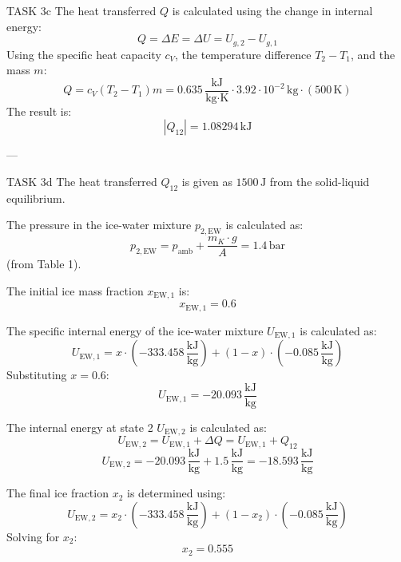 TASK 3c  
The heat transferred \( Q \) is calculated using the change in internal energy:  
\[
Q = \Delta E = \Delta U = U_{g,2} - U_{g,1}
\]  
Using the specific heat capacity \( c_V \), the temperature difference \( T_2 - T_1 \), and the mass \( m \):  
\[
Q = c_V (T_2 - T_1) m = 0.635 \, \frac{\text{kJ}}{\text{kg·K}} \cdot 3.92 \cdot 10^{-2} \, \text{kg} \cdot (500 \, \text{K})
\]  
The result is:  
\[
|Q_{12}| = 1.08294 \, \text{kJ}
\]  

---

TASK 3d  
The heat transferred \( Q_{12} \) is given as \( 1500 \, \text{J} \) from the solid-liquid equilibrium.  

The pressure in the ice-water mixture \( p_{2,\text{EW}} \) is calculated as:  
\[
p_{2,\text{EW}} = p_{\text{amb}} + \frac{m_K \cdot g}{A} = 1.4 \, \text{bar}
\]  
(from Table 1).  

The initial ice mass fraction \( x_{\text{EW},1} \) is:  
\[
x_{\text{EW},1} = 0.6
\]  

The specific internal energy of the ice-water mixture \( U_{\text{EW},1} \) is calculated as:  
\[
U_{\text{EW},1} = x \cdot (-333.458 \, \frac{\text{kJ}}{\text{kg}}) + (1 - x) \cdot (-0.085 \, \frac{\text{kJ}}{\text{kg}})
\]  
Substituting \( x = 0.6 \):  
\[
U_{\text{EW},1} = -20.093 \, \frac{\text{kJ}}{\text{kg}}
\]  

The internal energy at state 2 \( U_{\text{EW},2} \) is calculated as:  
\[
U_{\text{EW},2} = U_{\text{EW},1} + \Delta Q = U_{\text{EW},1} + Q_{12}
\]  
\[
U_{\text{EW},2} = -20.093 \, \frac{\text{kJ}}{\text{kg}} + 1.5 \, \frac{\text{kJ}}{\text{kg}} = -18.593 \, \frac{\text{kJ}}{\text{kg}}
\]  

The final ice fraction \( x_2 \) is determined using:  
\[
U_{\text{EW},2} = x_2 \cdot (-333.458 \, \frac{\text{kJ}}{\text{kg}}) + (1 - x_2) \cdot (-0.085 \, \frac{\text{kJ}}{\text{kg}})
\]  
Solving for \( x_2 \):  
\[
x_2 = 0.555
\]  

